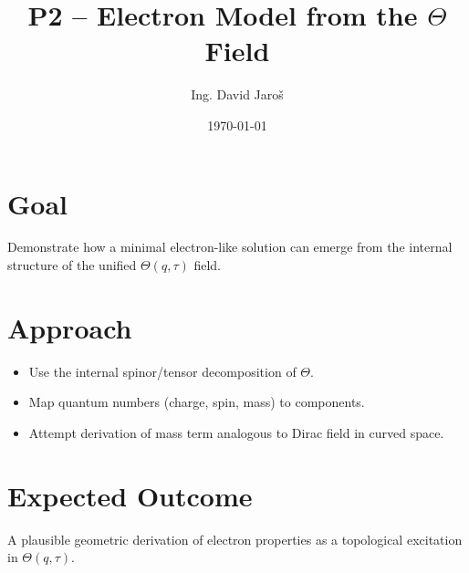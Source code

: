 \documentclass[12pt]{article}
\title{P2 – Electron Model from the $\Theta$ Field}
\author{Ing. David Jaroš}
\date{\today}
\begin{document}
\maketitle

\section*{Goal}
Demonstrate how a minimal electron-like solution can emerge from the internal structure of the unified $\Theta(q,\tau)$ field.

\section*{Approach}
\begin{itemize}
\item Use the internal spinor/tensor decomposition of $\Theta$.
\item Map quantum numbers (charge, spin, mass) to components.
\item Attempt derivation of mass term analogous to Dirac field in curved space.
\end{itemize}

\section*{Expected Outcome}
A plausible geometric derivation of electron properties as a topological excitation in $\Theta(q, \tau)$.
\end{document}
